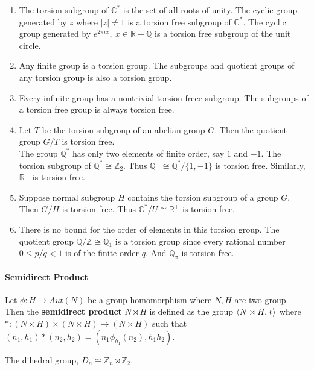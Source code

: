 \begin{enumerate}
	\item The torsion subgroup of $\mathbb{C}^\ast$ is the set of all roots of unity.
	The cyclic group generated by $z$ where $|z| \ne 1$ is a torsion free subgroup of $\mathbb{C}^\ast$.
	The cyclic group generated by $e^{2 \pi i x},\ x \in \mathbb{R}-\mathbb{Q}$ is a torsion free subgroup of the unit circle.
	\item Any finite group is a torsion group. The subgroups and quotient groups of any torsion group is also a torsion group. 
	\item Every infinite group has a nontrivial torsion freee subgroup. The subgroups of a torsion free group is always torsion free.
	\item Let $T$ be the torsion subgroup of an abelian group $G$. Then the quotient group $G/T$ is torsion free.\\

	The group $\mathbb{Q}^\ast$ has only two elements of finite order, say $1$ and $-1$.
	The torsion subgroup of $\mathbb{Q}^\ast \cong \mathbb{Z}_2$.
	Thus $\mathbb{Q}^+ \cong \mathbb{Q}^\ast / \{ 1,-1 \}$ is torsion free.
	Similarly, $\mathbb{R}^+$ is torsion free.
	\item Suppose normal subgroup $H$ contains the torsion subgroup of a group $G$. Then $G/H$ is torsion free.
	Thus $\mathbb{C}^\ast/U \cong \mathbb{R}^+$ is torsion free.
	\item There is no bound for the order of elements in this torsion group.
		The quotient group $\mathbb{Q}/\mathbb{Z} \cong \mathbb{Q}_1$ is a torsion group since every rational number $0 \le p/q < 1$ is of the finite order $q$. And $\mathbb{Q}_\pi$ is torsion free.
\end{enumerate}



\paragraph{Semidirect Product}
\begin{definition}
	Let $\phi : H \to Aut(N)$ be a group homomorphism where $N,H$ are two group.
	Then the \textbf{semidirect product} $N \rtimes H$ is defined as the group $\left\langle N \rtimes H,\ast \right\rangle$ where $\ast : (N \times H) \times (N \times H) \to (N \times H)$ such that $(n_1,h_1) \ast (n_2,h_2) = (n_1 \phi_{h_1}(n_2),h_1h_2)$.
\end{definition}

	The dihedral group, $D_n \cong \mathbb{Z}_n \rtimes \mathbb{Z}_2$.

